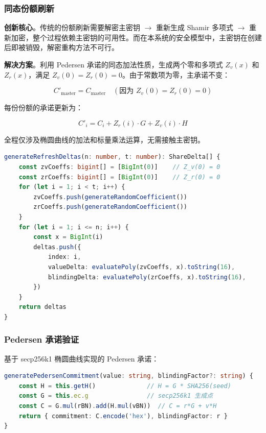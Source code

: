 \subsubsection{同态份额刷新}

\textbf{创新核心}。传统的份额刷新需要解密主密钥 $\rightarrow$ 重新生成 Shamir 多项式 $\rightarrow$ 重新加密，整个过程依赖主密钥的可用性。而在本系统的安全模型中，主密钥在创建后即被销毁，解密重构方法不可行。

\vspace{0.5em}
\noindent \textbf{解决方案}。利用 Pedersen 承诺的同态加法性质，生成两个零和多项式 $Z_v(x)$ 和 $Z_r(x)$，满足 $Z_v(0) = Z_r(0) = 0$。由于常数项为零，主承诺不变：

\[
C'_{\text{master}} = C_{\text{master}} \quad (\text{因为 } Z_v(0) = Z_r(0) = 0)
\]

每份份额的承诺更新为：

\[
C'_i = C_i + Z_r(i) \cdot G + Z_v(i) \cdot H
\]

全程仅涉及椭圆曲线的加法和标量乘法运算，无需接触主密钥。

\begin{lstlisting}[language=TypeScript, caption=零和多项式同态刷新（shamir.ts）]
generateRefreshDeltas(n: number, t: number): ShareDelta[] {
    const zvCoeffs: bigint[] = [BigInt(0)]    // Z_v(0) = 0
    const zrCoeffs: bigint[] = [BigInt(0)]    // Z_r(0) = 0
    for (let i = 1; i < t; i++) {
        zvCoeffs.push(generateRandomCoefficient())
        zrCoeffs.push(generateRandomCoefficient())
    }
    for (let i = 1; i <= n; i++) {
        const x = BigInt(i)
        deltas.push({
            index: i,
            valueDelta: evaluatePoly(zvCoeffs, x).toString(16),
            blindingDelta: evaluatePoly(zrCoeffs, x).toString(16),
        })
    }
    return deltas
}
\end{lstlisting}

\subsubsection{Pedersen 承诺验证}

基于 secp256k1 椭圆曲线实现的 Pedersen 承诺：

\begin{lstlisting}[language=TypeScript, caption=Pedersen 承诺生成（shamir.ts）]
generatePedersenCommitment(value: string, blindingFactor?: string) {
    const H = this.getH()              // H = G * SHA256(seed)
    const G = this.ec.g                // secp256k1 生成点
    const C = G.mul(rBN).add(H.mul(vBN))  // C = r*G + v*H
    return { commitment: C.encode('hex'), blindingFactor: r }
}
\end{lstlisting}

